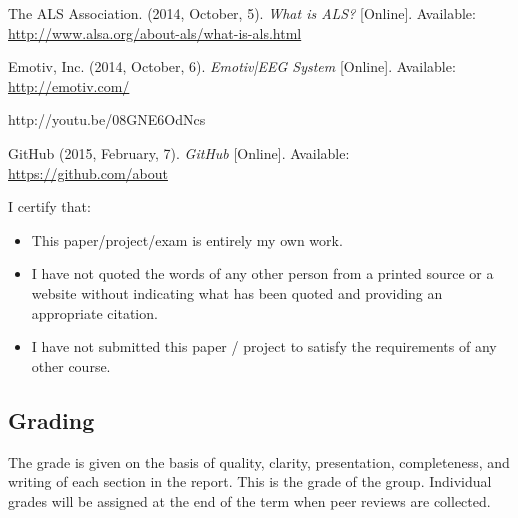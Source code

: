 \documentclass{report}
\begin{document}
\newpage
\begin{thebibliography}{1}

     The ALS Association. (2014, October, 5). \textit{What
        is ALS?} [Online]. Available:
        \url{http://www.alsa.org/about-als/what-is-als.html}
 
     Emotiv, Inc. (2014, October, 6). \textit{Emotiv|EEG
        System} [Online]. Available: \url{http://emotiv.com/}

     http://youtu.be/08GNE6OdNcs

     GitHub (2015, February, 7). \textit{GitHub} [Online]. Available: \url{https://github.com/about}


\end{thebibliography}

\newpage
\noindent I certify that:
\begin{itemize}
\item This paper/project/exam is entirely my own work.
\item I have not quoted the words of any other person from a printed source or a website without indicating what has been quoted and providing an appropriate citation.
\item I have not submitted this paper / project to satisfy the requirements of any other course.
\end{itemize}

\vspace{1cm}
\noindent{}


\vspace{0.5cm}
\noindent{}

\vspace{0.5cm}
\noindent{}

\vspace{0.5cm}
\noindent{}

\vspace{0.5cm}
\noindent{}

\vspace{\fill}
\subsection*{Grading}
The grade is given on the basis of quality, clarity, presentation, completeness, and writing of each section in the report. This is the grade of the group. Individual grades will be assigned at the end of the term when peer reviews are collected.
\end{document}
